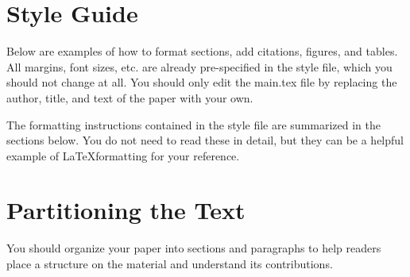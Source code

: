 \documentclass{article}
\begin{document}




\begin{abstract}
This is a basic LaTeX template for CSCI 567 project report.
It is based on the ICML 2021 LaTeX template.
\end{abstract}

\section{Style Guide}

Below are examples of how to format sections, add citations, figures, and tables.  All margins, font sizes, etc. are already pre-specified in the  style file, which you should not change at all.  You should only edit the main.tex file by replacing the author, title, and text of the paper with your own.

The formatting instructions contained in the style file are summarized in the sections below.  You do not need to read these in detail, but they can be a helpful example of \LaTeX formatting for your reference.


\section{Partitioning the Text}

You should organize your paper into sections and paragraphs to help
readers place a structure on the material and understand its
contributions.
\end{document}
